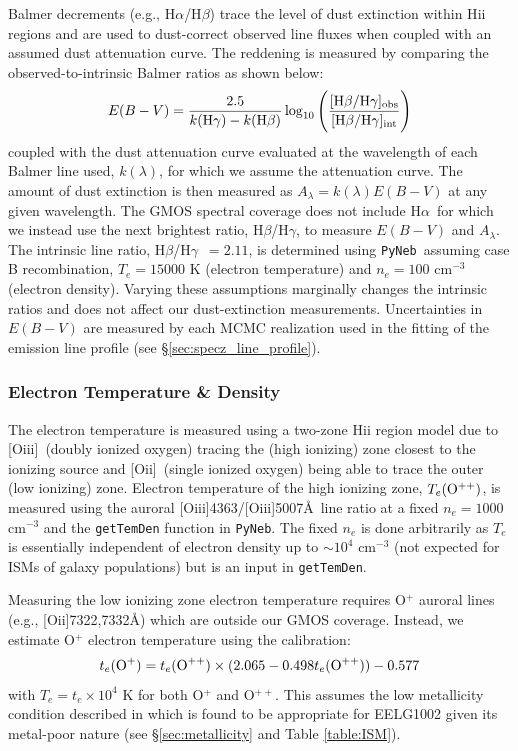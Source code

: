 \documentclass[twocolumn,tight,times,linenumbers]{aastex631}
\newcommand{\halpha}{H$\alpha$}
\newcommand{\hbeta}{H$\beta$}
\newcommand{\hgamma}{H$\gamma$}
\newcommand{\oii}{[O{\sc ii}]}
\newcommand{\oiii}{[O{\sc iii}]}
\newcommand{\pyneb}{\texttt{PyNeb}}
\begin{document}
		Balmer decrements (e.g., \halpha/\hbeta) trace the level of dust extinction within H{\sc ii} regions and are used to dust-correct observed line fluxes when coupled with an assumed dust attenuation curve. The reddening is measured by comparing the observed-to-intrinsic Balmer ratios as shown below:
		\begin{eqnarray}
			E(B-V) = \frac{2.5}{k(\textrm{\hgamma}) - k(\textrm{\hbeta})} \log_{10} \Bigg(\frac{ [\textrm{\hbeta}/\textrm{\hgamma}]_\textrm{\scriptsize obs} }{[\textrm{\hbeta}/\textrm{\hgamma}]_\textrm{\scriptsize int}}\Bigg)
		\end{eqnarray}
		coupled with the dust attenuation curve evaluated at the wavelength of each Balmer line used, $k(\lambda)$, for which we assume the \citet{Calzetti2000} attenuation curve. The amount of dust extinction is then measured as $A_\lambda = k(\lambda) E(B-V)$ at any given wavelength. The GMOS spectral coverage does not include \halpha~for which we instead use the next brightest ratio, \hbeta/\hgamma, to measure $E(B-V)$ and $A_\lambda$. The intrinsic line ratio, \hbeta/\hgamma~$ = 2.11$, is determined using \pyneb~assuming case B recombination, $T_e = 15000$ K (electron temperature) and $n_e = 100$ cm$^{-3}$ (electron density). Varying these assumptions marginally changes the intrinsic ratios and does not affect our dust-extinction measurements. Uncertainties in $E(B-V)$ are measured by each MCMC realization used in the fitting of the emission line profile (see \S\ref{sec:specz_line_profile}).
		
		\subsubsection{Electron Temperature \& Density}
		\label{sec:ne_and_te}
		The electron temperature is measured using a two-zone H{\sc ii} region model due to \oiii~(doubly ionized oxygen) tracing the (high ionizing) zone closest to the ionizing source and \oii~(single ionized oxygen) being able to trace the outer (low ionizing) zone. Electron temperature of the high ionizing zone, $T_e(\rm{O}^{++})$, is measured using the auroral \oiii4363/\oiii5007\AA~line ratio at a fixed $n_e = 1000$ cm$^{-3}$ and the \texttt{getTemDen} function in \pyneb. The fixed $n_e$ is done arbitrarily as $T_e$ is essentially independent of electron density up to $\sim 10^4$ cm$^{-3}$ (not expected for ISMs of galaxy populations) but is an input in \texttt{getTemDen}.%
		
		Measuring the low ionizing zone electron temperature requires O$^+$ auroral lines (e.g., \oii7322,7332\AA) which are outside our GMOS coverage. Instead, we estimate O$^+$ electron temperature using the \citet{Izotov2006} calibration:
		\begin{eqnarray}
			\centering
			t_e(\textrm{O}^+) = t_e(\textrm{O}^{++}) \times (2.065 - 0.498 t_e(\textrm{O}^{++}))  - 0.577
		\end{eqnarray}
		with $T_e  = t_e\times 10^4$ K for both O$^+$ and O$^{++}$. This assumes the low metallicity condition described in \citet{Izotov2006} which is found to be appropriate for EELG1002 given its metal-poor nature (see \S\ref{sec:metallicity} and Table \ref{table:ISM}).
\end{document}
